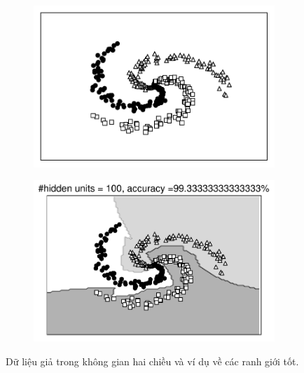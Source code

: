 \begin{figure}[t]
\begin{subfigure}{0.45\textwidth}
\includegraphics[width=0.99\linewidth]{ebookML_src/src/mlp/EX.pdf}
\caption{}
\label{fig:14_7a}
\end{subfigure}
\begin{subfigure}{0.45\textwidth}
\includegraphics[width=0.99\linewidth]{ebookML_src/src/mlp/ex_res100.pdf}
\caption{}
\label{fig:14_7b}
\end{subfigure}
\caption{
Dữ liệu giả trong không gian hai chiều và ví dụ về các ranh giới tốt.
}
\label{fig:14_7}
\end{figure}


